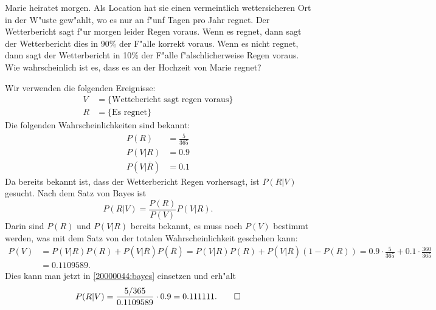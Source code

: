 Marie heiratet morgen.
Als Location hat sie einen vermeintlich wettersicheren Ort in 
der W"uste gew"ahlt, wo es nur an f"unf Tagen pro Jahr regnet.
Der Wetterbericht sagt f"ur morgen leider Regen voraus.
Wenn es regnet, dann sagt der Wetterbericht dies in 90\% der F"alle
korrekt voraus.
Wenn es nicht regnet, dann sagt der Wetterbericht in 10\% der F"alle
f"alschlicherweise Regen voraus.
Wie wahrscheinlich ist es, dass es an der Hochzeit von Marie regnet?


\begin{loesung}
Wir verwenden die folgenden Ereignisse:
\begin{align*}
V&=\{\text{Wettebericht sagt regen voraus}\}\\
R&=\{\text{Es regnet}\}
\end{align*}
Die folgenden Wahrscheinlichkeiten sind bekannt:
\begin{align*}
P(R)
&=
\frac{5}{365}
\\
P(V|R)
&=
0.9
\\
P(V|\overline{R})
&=
0.1
\end{align*}
Da bereits bekannt ist, dass der Wetterbericht Regen vorhersagt, ist
$P(R|V)$ gesucht.
Nach dem Satz von Bayes ist
\begin{equation}
P(R|V)
=
\frac{P(R)}{P(V)}P(V|R).
\label{20000044:bayes} 
\end{equation}
Darin sind $P(R)$ und $P(V|R)$ bereits bekannt, es muss noch $P(V)$ bestimmt
werden, was mit dem Satz von der totalen Wahrscheinlichkeit geschehen kann:
\begin{align*}
P(V)
&=
P(V|R)P(R)+P(V|\overline{R})P(\overline{R})
=
P(V|R)P(R)+P(V|\overline{R})(1-P(R))
=
0.9\cdot\frac{5}{365}+0.1\cdot\frac{360}{365}
\\
&=
0.1109589.
\end{align*}
Dies kann man jetzt in \eqref{20000044:bayes} einsetzen und erh"alt
\[
P(R|V)
=
\frac{5/365}{0.1109589}\cdot 0.9
=
0.111111.
\qedhere
\]
\end{loesung}

